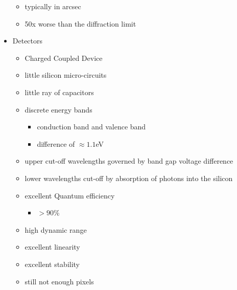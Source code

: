 \documentclass[a4paper,11pt,normalem]{article}
\begin{document}
\begin{itemize}
        \begin{itemize}
            \item typically in arcsec
            \item 50x worse than the diffraction limit
        \end{itemize}
    \item Detectors
        \begin{itemize}
            \item Charged Coupled Device
            \item little silicon micro-circuits
            \item little ray of capacitors
            \item discrete energy bands
                \begin{itemize}
                    \item conduction band and valence band
                    \item difference of \(\approx 1.1\)eV
                \end{itemize}
            \item upper cut-off wavelengths governed by band gap voltage difference
            \item lower wavelengths cut-off by absorption of photons into the silicon
            \item excellent Quantum efficiency
                \begin{itemize}
                    \item \(> 90\)\%
                \end{itemize}
            \item high dynamic range
            \item excellent linearity
            \item excellent stability
            \item still not enough pixels
        \end{itemize}
\end{itemize}

\section{}
\end{document}
